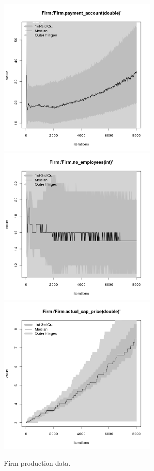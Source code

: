 \begin{figure}[H!]
\begin{minipage}{17cm}
\includegraphics[width=8cm]{./benchmark_plots/Firm-payment_account.png}\\
\includegraphics[width=8cm]{./benchmark_plots/Firm-no_employees.png}
\includegraphics[width=8cm]{./benchmark_plots/Firm-actual_cap_price.png}
\end{minipage}
\caption{Firm production data.}
\label{Figure: Firm Production}
\end{figure}

